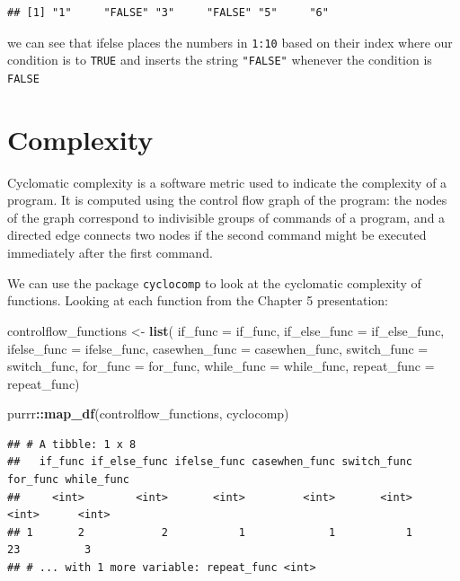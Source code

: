 \documentclass[]{book}
\newenvironment{Shaded}{\begin{snugshade}}{\end{snugshade}}
\newcommand{\DataTypeTok}[1]{\textcolor[rgb]{0.13,0.29,0.53}{#1}}
\newcommand{\KeywordTok}[1]{\textcolor[rgb]{0.13,0.29,0.53}{\textbf{#1}}}
\newcommand{\NormalTok}[1]{#1}
\newcommand{\OperatorTok}[1]{\textcolor[rgb]{0.81,0.36,0.00}{\textbf{#1}}}
\newcommand{\StringTok}[1]{\textcolor[rgb]{0.31,0.60,0.02}{#1}}
\begin{document}
\begin{verbatim}
## [1] "1"     "FALSE" "3"     "FALSE" "5"     "6"
\end{verbatim}

we can see that ifelse places the numbers in \texttt{1:10} based on their index where our condition is to \texttt{TRUE} and inserts the string \texttt{"FALSE"} whenever the condition is \texttt{FALSE}

\hypertarget{complexity}{%
\section*{Complexity}\label{complexity}}

Cyclomatic complexity is a software metric used to indicate the complexity of a program. It is computed using the control flow graph of the program: the nodes of the graph correspond to indivisible groups of commands of a program, and a directed edge connects two nodes if the second command might be executed immediately after the first command.

We can use the package \texttt{cyclocomp} to look at the cyclomatic complexity of functions. Looking at each function from the Chapter 5 presentation:

\begin{Shaded}
\begin{Highlighting}[]
\NormalTok{controlflow_functions <-}\StringTok{ }\KeywordTok{list}\NormalTok{(}
  \DataTypeTok{if_func =}\NormalTok{ if_func,}
  \DataTypeTok{if_else_func =}\NormalTok{ if_else_func,}
  \DataTypeTok{ifelse_func =}\NormalTok{ ifelse_func,}
  \DataTypeTok{casewhen_func =}\NormalTok{ casewhen_func,}
  \DataTypeTok{switch_func =}\NormalTok{ switch_func, }
  \DataTypeTok{for_func =}\NormalTok{ for_func,}
  \DataTypeTok{while_func =}\NormalTok{ while_func,}
  \DataTypeTok{repeat_func =}\NormalTok{ repeat_func)}

\NormalTok{purrr}\OperatorTok{::}\KeywordTok{map_df}\NormalTok{(controlflow_functions, cyclocomp)}
\end{Highlighting}
\end{Shaded}

\begin{verbatim}
## # A tibble: 1 x 8
##   if_func if_else_func ifelse_func casewhen_func switch_func for_func while_func
##     <int>        <int>       <int>         <int>       <int>    <int>      <int>
## 1       2            2           1             1           1       23          3
## # ... with 1 more variable: repeat_func <int>
\end{verbatim}
\end{document}
